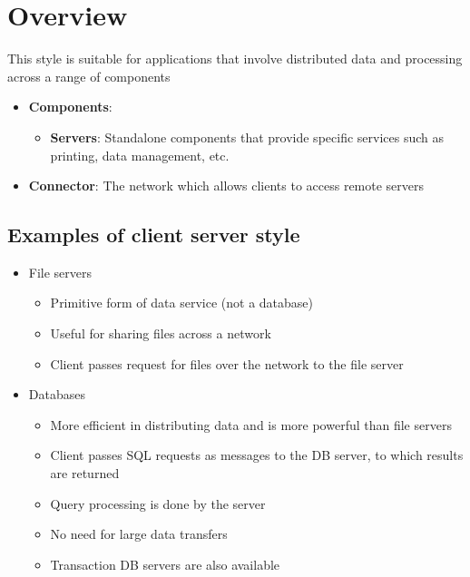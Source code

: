 \documentclass[12pt]{book}
\begin{document}
\section{Overview}
This style is suitable for applications that involve distributed data and processing across a range of components
\begin{itemize}
    \item \textbf{Components}:
    \begin{itemize}
        \item \textbf{Servers}: Standalone components that provide specific services such as printing, data management, etc.
    \end{itemize}

    \item \textbf{Connector}: The network which allows clients to access remote servers
\end{itemize}

\subsection{Examples of client server style}

\begin{itemize}
    \item File servers
    \begin{itemize}
        \item Primitive form of data service (not a database)
        \item Useful for sharing files across a network
        \item Client passes request for files over the network to the file server
    \end{itemize} 

    \item Databases
    \begin{itemize}
        \item More efficient in distributing data and is more powerful than file servers
        \item Client passes SQL requests as messages to the DB server, to which results are returned
        \item Query processing is done by the server
        \item No need for large data transfers
        \item Transaction DB servers are also available
    \end{itemize} 
\end{itemize}
\end{document}
